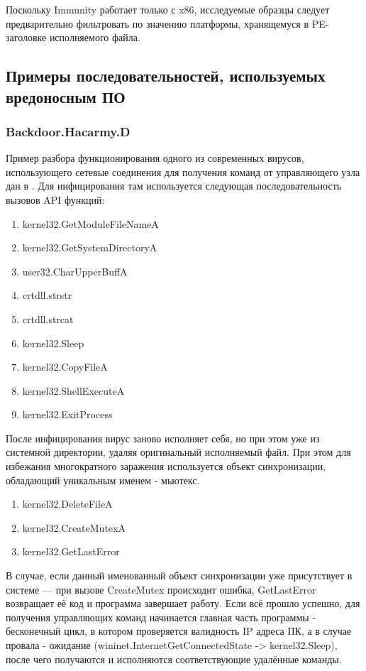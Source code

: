 Поскольку Immunity работает только с x86, исследуемые образцы следует предварительно фильтровать по значению платформы, хранящемуся в PE-заголовке исполняемого файла.
\subsection {Примеры последовательностей, используемых вредоносным ПО}
\subsubsection {Backdoor.Hacarmy.D}
Пример разбора функционирования одного из современных вирусов, использующего сетевые соединения для
получения команд от управляющего узла дан в \cite{REVERSING}. Для инфицирования там используется следующая последовательность вызовов API функций:
\begin {enumerate}
	\item kernel32.GetModuleFileNameA
	\item kernel32.GetSystemDirectoryA
	\item user32.CharUpperBuffA
	\item crtdll.strstr
	\item crtdll.strcat
	\item kernel32.Sleep
	\item kernel32.CopyFileA
	\item kernel32.ShellExecuteA
	\item kernel32.ExitProcess
\end {enumerate}
После инфицирования вирус заново исполняет себя, но при этом уже из системной директории, удаляя оригинальный исполняемый файл. При этом для избежания многократного заражения используется объект синхронизации, обладающий уникальным именем - мьютекс.
\begin {enumerate}
	\item kernel32.DeleteFileA
	\item kernel32.CreateMutexA
	\item kernel32.GetLastError
\end {enumerate}
В случае, если данный именованный объект синхронизации уже присутствует в системе --- при вызове CreateMutex происходит ошибка, GetLastError возвращает её код и программа завершает работу. Если всё прошло успешно, для получения управляющих команд начинается главная часть программы - бесконечный цикл, в котором проверяется валидность IP адреса ПК, а в случае провала - ожидание (wininet.InternetGetConnectedState -> kernel32.Sleep), после чего получаются и исполняются соответствующие удалённые команды.
